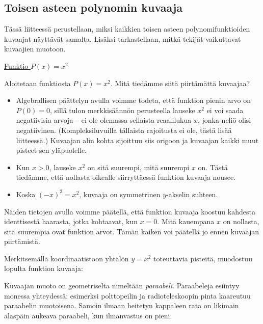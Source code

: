 \subsection*{Toisen asteen polynomin kuvaaja}

Tässä liitteessä perustellaan, miksi kaikkien toisen asteen polynomifunktioiden kuvaajat näyttävät samalta. Lisäksi tarkastellaan, mitkä tekijät vaikuttavat kuvaajien muotoon.

\underline{Funktio $P(x)=x^2$}

Aloitetaan funktiosta $P(x)=x^2$. Mitä tiedämme siitä piirtämättä kuvaajaa?
\begin{itemize}
\item Algebrallisen päättelyn avulla voimme todeta, että funktion pienin arvo on $P(0) = 0$, sillä tulon merkkisäännön perusteella lauseke $x^2$ ei voi saada negatiivisia arvoja – ei ole olemassa sellaista reaalilukua $x$, jonka neliö olisi negatiivinen. (Kompleksiluvuilla tällaista rajoitusta ei ole, tästä lisää liitteessä.) Kuvaajan alin kohta sijoittuu siis origoon ja kuvaajan kaikki muut pisteet sen yläpuolelle.
\item Kun $x > 0$, lauseke $x^2$  on sitä
suurempi, mitä suurempi $x$ on. Tästä tiedämme, että nollasta oikealle siirryttäessä funktion kuvaaja nousee.
\item Koska $(-x)^2 = x^2$, kuvaaja on symmetrinen $y$-akselin suhteen.
\end{itemize}

Näiden tietojen avulla voimme päätellä, että funktion kuvaaja koostuu kahdesta
identtisestä haarasta, jotka kohtaavat, kun $x=0$. Mitä kauempana $x$ on nollasta, sitä suurempia ovat funktion arvot. Tämän kaiken voi päätellä jo ennen kuvaajan piirtämistä.

Merkitsemällä koordinaatistoon yhtälön $y=x^2$ toteuttavia pisteitä, muodostuu lopulta funktion kuvaaja:
\begin{center}
\begin{kuvaajapohja}{2}{-2}{2}{-1}{4}
\end{kuvaajapohja}
\end{center}

Kuvaajan muoto on geometriselta nimeltään \emph{paraabeli}. Paraabeleja esiintyy monessa yhteydessä: esimerksi polttopeilin ja radioteleskoopin pinta kaareutuu paraabelin muotoisena. Samoin ilmaan heitetyn kappaleen rata on likimain alaspäin aukeava paraabeli, kun ilmanvastus on pieni.

